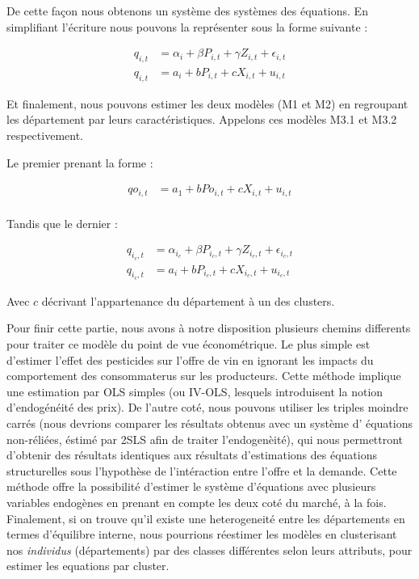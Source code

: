 \documentclass[11pt,]{article}
\begin{document}
De cette façon nous obtenons un système des systèmes des équations. En
simplifiant l'écriture nous pouvons la représenter sous la forme
suivante :

\begin{align*}
  q_{i,t} & = \alpha_{i} + \beta P_{i,t} + \gamma Z_{i,t} + \epsilon_{i,t} \\
  q_{i,t} & = a_i + b P_{i,t} + c X_{i,t} + u_{i,t}
\end{align*}

Et finalement, nous pouvons estimer les deux modèles (M1 et M2) en
regroupant les département par leurs caractéristiques. Appelons ces
modèles M3.1 et M3.2 respectivement.

Le premier prenant la forme :

\begin{align*}
  qo_{i,t} & = a_1 + b Po_{i,t} + c X_{i,t} + u_{i,t} \\ 
\end{align*}

Tandis que le dernier :

\begin{align*}
  q_{i_{c},t} & = \alpha_{i_{c}} + \beta P_{i_{c},t} + \gamma Z_{i_{c},t} + \epsilon_{i_{c},t} \\
  q_{i_{c},t} & = a_i + b P_{i_{c},t} + c X_{i_{c},t} + u_{i_{c},t}
\end{align*}

Avec \(c\) décrivant l'appartenance du département à un des clusters.

Pour finir cette partie, nous avons à notre disposition plusieurs
chemins differents pour traiter ce modèle du point de vue économétrique.
Le plus simple est d'estimer l'effet des pesticides sur l'offre de vin
en ignorant les impacts du comportement des consommaterus sur les
producteurs. Cette méthode implique une estimation par OLS simples (ou
IV-OLS, lesquels introduisent la notion d'endogénéité des prix). De
l'autre coté, nous pouvons utiliser les triples moindre carrés (nous
devrions comparer les résultats obtenus avec un système d' équations
non-réliées, éstimé par 2SLS afin de traiter l'endogenèité), qui nous
permettront d'obtenir des résultats identiques aux résultats
d'estimations des équations structurelles sous l'hypothèse de
l'intéraction entre l'offre et la demande. Cette méthode offre la
possibilité d'estimer le système d'équations avec plusieurs variables
endogènes en prenant en compte les deux coté du marché, à la fois.
Finalement, si on trouve qu'il existe une heterogeneité entre les
départements en termes d'équilibre interne, nous pourrions réestimer les
modèles en clusterisant nos \emph{individus} (départements) par des
classes différentes selon leurs attributs, pour estimer les equations
par cluster.
\end{document}
